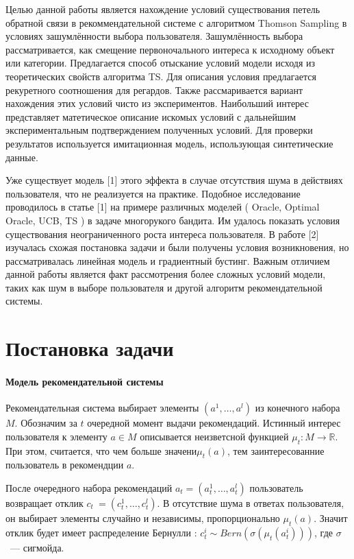 \documentclass[12pt, twoside]{article}
\begin{document}
Целью данной работы является нахождение условий существования петель обратной связи в рекоммендательной системе с алгоритмом Thomson Sampling в условиях зашумлённости выбора пользователя.
Зашумлённость выбора рассматривается, как смещение первоночального интереса к исходному объект или категории.
Предлагается способ отыскание условий модели исходя из теоретических свойств алгоритма TS. 
Для описания условия предлагается рекуретного соотношения для регардов.  
Также рассмаривается вариант нахождения этих условий чисто из экспериментов. 
Наибольший интерес представляет матетическое описание искомых условий с дальнейшим экспериментальным подтверждением полученных условий.
Для проверки результатов используется имитационная модель, использующая синтетические данные.  

Уже существует модель [1] этого эффекта в случае отсутствия шума в действиях пользователя, что не реализуется на практике. 
Подобное исследование проводилось в статье [1] на примере различных моделей ( Oracle, Optimal Oracle, UCB,  TS ) в задаче многорукого бандита. 
Им удалось показать условия существования неограниченного роста интереса пользователя. 
В работе [2] изучалась схожая постановка задачи и были получены условия возникновения, но рассматривалась линейная модель и градиентный бустинг. 
Важным отличием данной работы является факт рассмотрения более сложных условий модели, таких как шум в выборе пользователя и другой алгоритм рекомендательной системы.  

\section{Постановка задачи}
\paragraph{Модель рекомендательной системы}
Рекомендательная система выбирает элементы $(a^1, \dots, a^l)$ из конечного набора $M$. 
Обозначим за $t$ очередной момент выдачи рекомендаций.
Истинный $\textit{интерес}$ пользователя к элементу $a \in M$ описывается неизветсной функцией $\mu_t : M \to \mathbb{R}$. 
При этом,  считается, что чем больше значени$\mu_t (a)$, тем заинтересованние пользователь в рекомендции $a$.

После очередного набора рекомендаций $a_t = (a_t^1, \dots, a_t^l)$ пользователь возвращает $\textit{отклик}$ $c_t~= (c_t^1, \dots, c_t^l)$. 
В отсутствие шума в ответах пользователя, он выбирает элементы случайно и независимы, пропорционально $\mu_t(a)$.
Значит отклик будет имеет распределение Бернулли : $c_t^i \sim Bern (\sigma(\mu_t(a_t^i)))$, где $\sigma$~--- сигмойда. 
\end{document}
